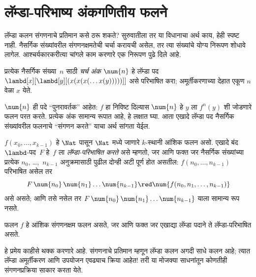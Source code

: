 \section{लॅम्डा-परिभाष्य अंकगणितीय फलने}\label{lam:int:rep:sec}

लॅम्डा कलन संगणनाचे प्रतिमान कसे ठरू शकते? सुरुवातीला तर या
विधानाचा अर्थ काय, हेही स्पष्ट नाही. नैसर्गिक संख्यांवरील
संगणनक्षमतेची चर्चा करायची असेल, तर त्या संख्यांचे योग्य
निरूपण शोधावे लागेल. आश्चर्यकारकरीत्या चांगले काम करणारे
एक निरूपण पुढे दिले आहे.

\begin{defn}
प्रत्येक नैसर्गिक संख्या~$n$ साठी \emph{चर्च अंक}
$\num{n}$ हे लॅम्डा पद $\lambd[x][\lambd[y][(x(x(x(\dots
x(y)))))]]$ असे परिभाषित करा; अमूर्तीकरणाच्या देहात एकूण $n$ वेळा $x$ येते.
\end{defn}

$\num{n}$ ही पदे “पुनरावर्तक” आहेत: $f$ हा निविष्ट दिल्यास
$\num{n}$ हे $y$ ला $f^n(y)$ शी जोडणारे फलन परत करते.
प्रत्येक अंक सामान्य रूपात आहे, हे लक्षात घ्या. आता
एखादे लॅम्डा पद नैसर्गिक संख्यांवरील फलनाचे “संगणन करते”
याचा अर्थ सांगता येईल.

\begin{defn}
$f(x_0, \dots, x_{k-1})$ हे $\Nat$ पासून $\Nat$ मध्ये
जाणारे $k$-स्थानी आंशिक फलन असो. एखादे बंद $\lambd$-पद~$F$
हे~$f$ ला \emph{लॅम्डा-परिभाषित करते} असे म्हणतो, जर आणि फक्त जर
नैसर्गिक संख्यांच्या प्रत्येक $n_0$, \dots,~$n_{k-1}$
अनुक्रमासाठी पुढील दोन्ही अटी पूर्ण होत असतील: $f(n_0, \dots, n_{k-1})$ परिभाषित असेल तर
\[F\, \num{n_0}\, \num{n_1} \dots \num{n_{k-1}} \red \num{f(n_0, n_1, \dots,
  n_{k-1})}
\]
असे असते; आणि तसे नसेल तर $F\, \num{n_0}\, \num{n_1}
\dots \num{n_{k-1}}$ याला सामान्य रूप नसते.
\end{defn}

\begin{thm}
\label{lam:int:rep:thm:lambda-def}
फलन $f$ हे आंशिक संगणनक्षम फलन असते, जर आणि फक्त जर
एखाद्या लॅम्डा पदाने ते लॅम्डा-परिभाषित असते.
\end{thm}

\begin{explain}
हे प्रमेय काहीसे थक्क करणारे आहे. संगणनाचे प्रतिमान म्हणून
लॅम्डा कलन अगदी साधे कलन आहे; त्यात लॅम्डा अमूर्तीकरण आणि
उपयोजन एवढ्याच क्रिया आहेत!{} तरी या मोजक्या साधनांतून
कोणतीही संगणनप्रक्रिया साकार करता येते.
\end{explain}











